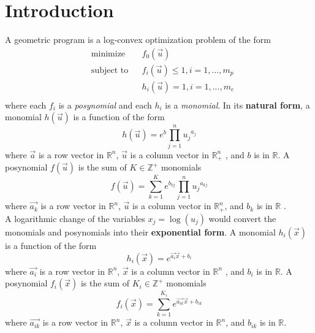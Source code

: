 \section{Introduction} \label{intro}
A geometric program is a log-convex optimization problem of the form
\begin{equation}
\begin{aligned}
	& \text{minimize} && f_0 \left(\vec{u}\right) \\
	& \text{subject to} && f_i \left(\vec{u}\right) \leq 1, i = 1,...,m_p\\
	& && h_i \left(\vec{u}\right) = 1, i = 1, ...,m_e\\
\end{aligned}
\label{GP_standard}
\end{equation}
where each $f_i$ is a {\em posynomial} and each $h_i$ is a {\em monomial}. In its \textbf{natural form}, a monomial $h(\vec{u})$ is a function of the form
\begin{displaymath}
	h(\vec{u}) = e^{b}\textstyle{\prod}_{j=1}^{n}{u_j}^{a_j}
\end{displaymath}
where $\vec{a}$ is a row vector in $\mathbb{R}^n$, $\vec{u}$ is a column vector in $\mathbb{R}^n_+$ , and $b$ is in $\mathbb{R}$. A posynomial $f(\vec{u})$ is the sum of $K \in \mathbb{Z}^+$ monomials
\begin{displaymath}
	f(\vec{u}) = \textstyle{\sum_{k=1}^{K}}e^{b_{kj}}\prod_{j=1}^{n}{u_j}^{a_{kj}}
\end{displaymath}
where $\vec{a_{k}}$ is a row vector in $\mathbb{R}^n$, $\vec{u}$ is a column vector in $\mathbb{R}^n_+$, and $b_{k}$ is in $\mathbb{R}$ \cite{GP_tutorial}.\\
A logarithmic change of the variables $x_j = \log(u_j)$ would convert the monomials and posynomials into their \textbf{exponential form}. A monomial $h_i(\vec{x})$ is a function of the form
\begin{displaymath}
    h_i(\vec{x}) = e^{\vec{a_i}\vec{x} + b_i}
\end{displaymath}
where $\vec{a_i}$ is a row vector in $\mathbb{R}^n$, $\vec{x}$ is a column vector in $\mathbb{R}^n$ , and $b_i$ is in $\mathbb{R}$. A posynomial $f_i(\vec{x})$ is the sum of $K_i \in \mathbb{Z}^+$ monomials
\begin{displaymath}
    f_i(\vec{x}) = \textstyle{\sum_{k=1}^{K_i}}e^{\vec{a_{ik}}\vec{x} + b_{ik}}
\end{displaymath}
where $\vec{a_{ik}}$ is a row vector in $\mathbb{R}^n$, $\vec{x}$ is a column vector in $\mathbb{R}^n$, and $b_{ik}$ is in $\mathbb{R}$.

